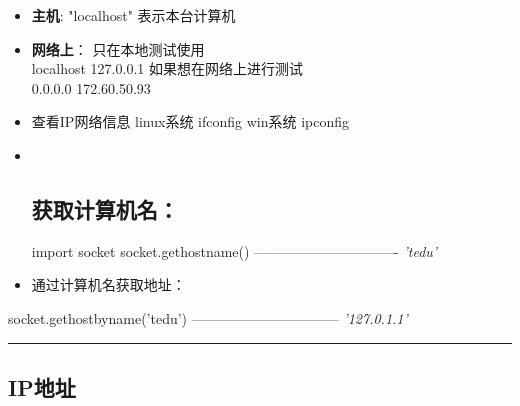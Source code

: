 \documentclass[11pt]{article}
\newenvironment{Shaded}{}{}
\newcommand{\StringTok}[1]{\textcolor[rgb]{0.25,0.44,0.63}{{#1}}}
\newcommand{\CommentTok}[1]{\textcolor[rgb]{0.38,0.63,0.69}{\textit{{#1}}}}
\newcommand{\NormalTok}[1]{{#1}}
\newcommand{\ImportTok}[1]{{#1}}
\newcommand{\OperatorTok}[1]{\textcolor[rgb]{0.40,0.40,0.40}{{#1}}}
\begin{document}
\begin{itemize}
\item
  \textbf{主机}: "localhost" 表示本台计算机
\item
  \textbf{网络上}： 只在本地测试使用\\
  localhost 127.0.0.1 如果想在网络上进行测试\\
  0.0.0.0 172.60.50.93
\item
  查看IP网络信息 linux系统 ifconfig win系统 ipconfig
\item ~
  \subsection{获取计算机名：}\label{ux83b7ux53d6ux8ba1ux7b97ux673aux540d}

\begin{Shaded}
\begin{Highlighting}[]
\ImportTok{import}\NormalTok{ socket}
\NormalTok{socket.gethostname()}
\OperatorTok{-------------------------------}
\CommentTok{'tedu'}
\end{Highlighting}
\end{Shaded}
\item
  通过计算机名获取地址：
\end{itemize}

\begin{Shaded}
\begin{Highlighting}[]
\NormalTok{socket.gethostbyname(}\StringTok{'tedu'}\NormalTok{)}
\OperatorTok{--------------------------------}
\CommentTok{'127.0.1.1'}
\end{Highlighting}
\end{Shaded}

\begin{center}\rule{0.5\linewidth}{\linethickness}\end{center}

\subsection{IP地址}\label{ipux5730ux5740}
\end{document}
